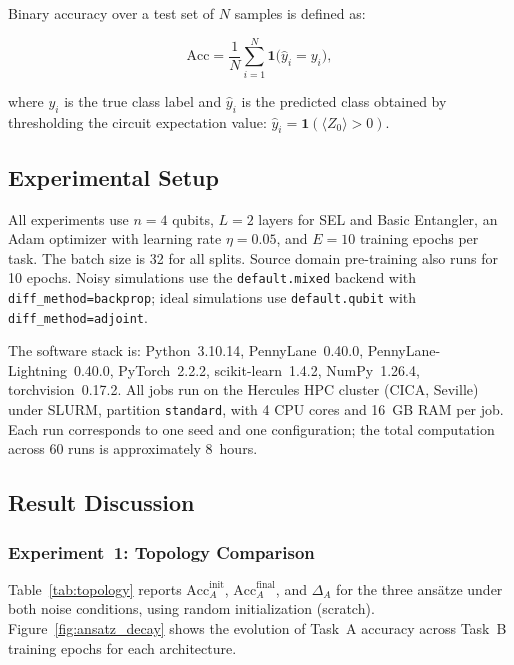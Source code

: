 \documentclass[10pt,conference]{IEEEtran}
\begin{document}
Binary accuracy over a test set of $N$ samples is defined as:

\begin{equation}
  \text{Acc} = \frac{1}{N} \sum_{i=1}^{N}
    \mathbf{1}\bigl(\hat{y}_i = y_i\bigr),
  \label{eq:acc}
\end{equation}

where $y_i$ is the true class label and $\hat{y}_i$ is the predicted
class obtained by thresholding the circuit expectation value:
$\hat{y}_i = \mathbf{1}(\langle Z_0 \rangle > 0)$.

\subsection{Experimental Setup}
\label{sec:setup}

All experiments use $n = 4$ qubits, $L = 2$ layers for SEL and Basic
Entangler, an Adam optimizer with learning rate $\eta = 0.05$, and
$E = 10$ training epochs per task. The batch size is 32 for all splits.
Source domain pre-training also runs for 10 epochs. Noisy simulations
use the \texttt{default.mixed} backend with \texttt{diff\_method=backprop};
ideal simulations use \texttt{default.qubit} with
\texttt{diff\_method=adjoint}.

The software stack is: Python~3.10.14, PennyLane~0.40.0,
PennyLane-Lightning~0.40.0, PyTorch~2.2.2, scikit-learn~1.4.2,
NumPy~1.26.4, torchvision~0.17.2. All jobs run on the Hercules HPC
cluster (CICA, Seville) under SLURM, partition \texttt{standard}, with
4 CPU cores and 16~GB RAM per job. Each run corresponds to one seed and
one configuration; the total computation across 60 runs is approximately
8~hours.

\subsection{Result Discussion}
\label{sec:results}

\subsubsection{Experiment~1: Topology Comparison}
\label{sec:topology}

Table~\ref{tab:topology} reports $\text{Acc}_A^\text{init}$,
$\text{Acc}_A^\text{final}$, and $\Delta_A$ for the three ans\"{a}tze
under both noise conditions, using random initialization (scratch).
Figure~\ref{fig:ansatz_decay} shows the evolution of Task~A accuracy
across Task~B training epochs for each architecture.
\end{document}
